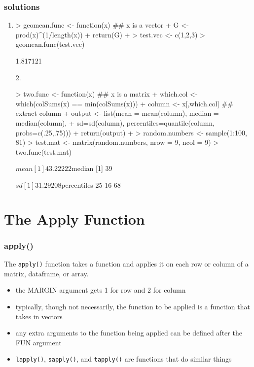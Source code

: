 \documentclass[handout]{beamer}
\newcommand{\red}{\color{red}}
\begin{document}
\begin{frame}[fragile]
\frametitle{solutions}
\begin{enumerate}
\red
\footnotesize
\item
\begin{Schunk}
\begin{Sinput}
> geomean.func <- function(x){  ## x is a vector 
+   G <- prod(x)^(1/length(x))
+   return(G)
+ }
> test.vec <- c(1,2,3)
> geomean.func(test.vec)
\end{Sinput}
\begin{Soutput}
[1] 1.817121
\end{Soutput}
\end{Schunk}
\end{enumerate}
\end{frame}

\begin{frame}[fragile]
\begin{enumerate}
\red
\footnotesize
\item[2.]
\begin{Schunk}
\begin{Sinput}
> two.func <- function(x){  ## x is a matrix
+   which.col <- which(colSums(x) == min(colSums(x)))
+   column <- x[,which.col] ## extract column
+   output <- list(mean = mean(column), median = median(column), 
+   sd=sd(column), percentiles=quantile(column, probs=c(.25,.75)))
+   return(output)
+ }
> random.numbers <- sample(1:100, 81)
> test.mat <- matrix(random.numbers, nrow = 9, ncol = 9)
> two.func(test.mat)
\end{Sinput}
\begin{Soutput}
$mean
[1] 43.22222

$median
[1] 39

$sd
[1] 31.29208

$percentiles
25%
 16  68 
\end{Soutput}
\end{Schunk}
\end{enumerate}
\end{frame}

\section{The Apply Function}
\begin{frame}
\frametitle{apply()}
The {\tt \red apply()} function takes a function and applies it on each row or column of a matrix, dataframe, or array.
\bigskip
\pause
\begin{itemize}
\item the MARGIN argument gets 1 for row and 2 for column
\pause
\item typically, though not necessarily, the function to be applied is a function that takes in vectors
\pause
\item any extra arguments to the function being applied can be defined after the FUN argument
\pause
\item {\tt \red lapply()}, {\tt \red sapply()}, and {\tt \red tapply()} are functions that do similar things
\end{itemize}
\end{frame}
\end{document}

